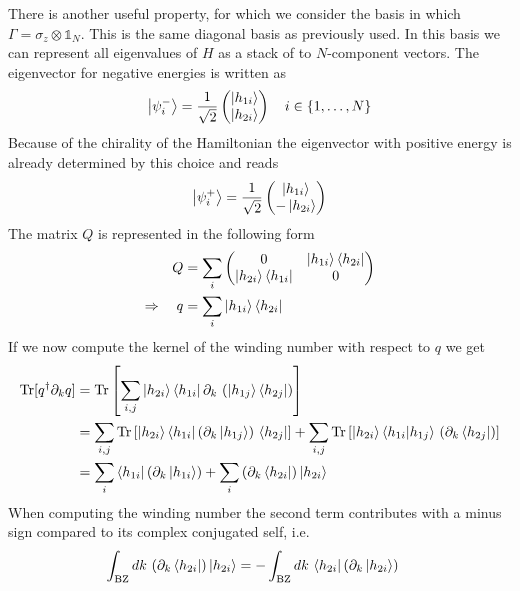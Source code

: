 There is another useful property, for which we consider the basis in which $\Gamma=\sigma_z \otimes \mathbb{1}_N$. This is the same diagonal basis as previously used. In this basis we can represent all eigenvalues of $H$ as a stack of to $N$-component vectors. The eigenvector for negative energies is written as
\begin{align*}
    \ket{\psi_{i}^-}=\frac{1}{\sqrt{2}}\begin{pmatrix}
        \ket{h_{1i}} \\
        \ket{h_{2i}}
    \end{pmatrix}\quad i\in\{1,\dots,N\}
\end{align*}
Because of the chirality of the Hamiltonian the eigenvector with positive energy is already determined by this choice and reads
\begin{align*}
    \ket{\psi^+_{i}}=\frac{1}{\sqrt{2}}\begin{pmatrix}
        \ket{h_{1i}} \\
        -\ket{h_{2i}}
    \end{pmatrix}
\end{align*}
The matrix $Q$ is represented in the following form
\begin{align*}
    Q&=\sum_i\begin{pmatrix}
        0 & \ket{h_{1i}}\bra{h_{2i}} \\
        \ket{h_{2i}}\bra{h_{1i}} & 0
    \end{pmatrix}\\
    \Rightarrow\quad q&= \sum_i\ket{h_{1i}}\bra{h_{2i}}
\end{align*}
If we now compute the kernel of the winding number with respect to $q$ we get
\begin{align*}
    \text{Tr}[q^\dagger\partial_k q]&= \text{Tr}\left[ \sum_{i,j}\ket{h_{2i}}\bra{h_{1i}}\partial_k\,\left( \ket{h_{1j}}\bra{h_{2j}}\right) \right]\\
    &=\sum_{i,j}\text{Tr}\left[\ket{h_{2i}}\bra{h_{1i}}\left( \partial_k\ket{h_{1j}}\right)\,\bra{h_{2j}} \right]+\sum_{i,j}\text{Tr}\left[ \ket{h_{2i}}\bra{h_{1i}}\ket{h_{1j}}\,\left(\partial_k \bra{h_{2j}}\right) \right]\\
    &=\sum_{i}\bra{h_{1i}}\left( \partial_k\ket{h_{1i}}\right)+\sum_{i} \left(\partial_k \bra{h_{2i}}\right)\ket{h_{2i}} 
\end{align*}
When computing the winding number the second term contributes with a minus sign compared to its complex conjugated self, i.e.
\begin{align*}
    \int_{\text{BZ}} dk\,\left(\partial_k \bra{h_{2i}}\right)\ket{h_{2i}}&=  -\int_{\text{BZ}} dk\, \bra{h_{2i}}\left(\partial_k\ket{h_{2i}}\right)
\end{align*}
